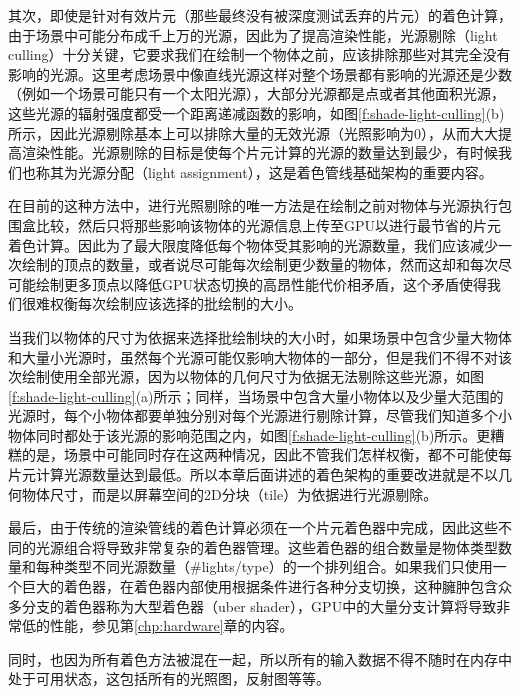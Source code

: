 其次，即使是针对有效片元（那些最终没有被深度测试丢弃的片元）的着色计算，由于场景中可能分布成千上万的光源，因此为了提高渲染性能，光源剔除（light culling）十分关键，它要求我们在绘制一个物体之前，应该排除那些对其完全没有影响的光源。这里考虑场景中像直线光源这样对整个场景都有影响的光源还是少数（例如一个场景可能只有一个太阳光源），大部分光源都是点或者其他面积光源，这些光源的辐射强度都受一个距离递减函数的影响，如图\ref{f:shade-light-culling}(b)所示，因此光源剔除基本上可以排除大量的无效光源（光照影响为0），从而大大提高渲染性能。光源剔除的目标是使每个片元计算的光源的数量达到最少，有时候我们也称其为光源分配（light assignment），这是着色管线基础架构的重要内容。

在目前的这种方法中，进行光照剔除的唯一方法是在绘制之前对物体与光源执行包围盒比较，然后只将那些影响该物体的光源信息上传至GPU以进行最节省的片元着色计算。因此为了最大限度降低每个物体受其影响的光源数量，我们应该减少一次绘制的顶点的数量，或者说尽可能每次绘制更少数量的物体，然而这却和每次尽可能绘制更多顶点以降低GPU状态切换的高昂性能代价相矛盾，这个矛盾使得我们很难权衡每次绘制应该选择的批绘制的大小。

当我们以物体的尺寸为依据来选择批绘制块的大小时，如果场景中包含少量大物体和大量小光源时，虽然每个光源可能仅影响大物体的一部分，但是我们不得不对该次绘制使用全部光源，因为以物体的几何尺寸为依据无法剔除这些光源，如图\ref{f:shade-light-culling}(a)所示；同样，当场景中包含大量小物体以及少量大范围的光源时，每个小物体都要单独分别对每个光源进行剔除计算，尽管我们知道多个小物体同时都处于该光源的影响范围之内，如图\ref{f:shade-light-culling}(b)所示。更糟糕的是，场景中可能同时存在这两种情况，因此不管我们怎样权衡，都不可能使每片元计算光源数量达到最低。所以本章后面讲述的着色架构的重要改进就是不以几何物体尺寸，而是以屏幕空间的2D分块（tile）为依据进行光源剔除。

最后，由于传统的渲染管线的着色计算必须在一个片元着色器中完成，因此这些不同的光源组合将导致非常复杂的着色器管理。这些着色器的组合数量是物体类型数量和每种类型不同光源数量（\#lights/type）的一个排列组合。如果我们只使用一个巨大的着色器，在着色器内部使用根据条件进行各种分支切换，这种臃肿包含众多分支的着色器称为大型着色器（uber shader），GPU中的大量分支计算将导致非常低的性能，参见第\ref{chp:hardware}章的内容。

同时，也因为所有着色方法被混在一起，所以所有的输入数据不得不随时在内存中处于可用状态，这包括所有的光照图，反射图等等。

